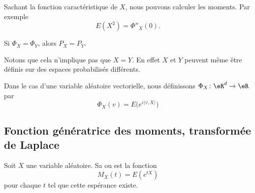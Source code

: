\begin{example}
    Sachant la fonction caractéristique de \( X\), nous pouvons calculer les moments. Par exemple
    \begin{equation}
        E(X^2)=\Phi''_X(0).
    \end{equation}
\end{example}

\begin{theorem}     \label{ThonMxtTy}
    Si \( \Phi_X=\Phi_Y\), alors \( P_X=P_Y\).
\end{theorem}
Notons que cela n'implique pas que \( X=Y\). En effet \( X\) et \( Y\) peuvent même être définis sur des espaces probabilisés différents.

Dans le cas d'une variable aléatoire vectorielle, nous définissons \( \Phi_X\colon \eR^d\to \eR\) par
\begin{equation}        \label{EqydvDxg}
    \Phi_X(v)=E\big(  e^{i\langle v, X\rangle } \big)
\end{equation}

\subsection{Fonction génératrice des moments, transformée de Laplace}

Soit \( X\) une variable aléatoire. Sa  ou  est la fonction
\begin{equation}
    M_X(t)=E( e^{tX})
\end{equation}
pour chaque \( t\) tel que cette espérance existe.

